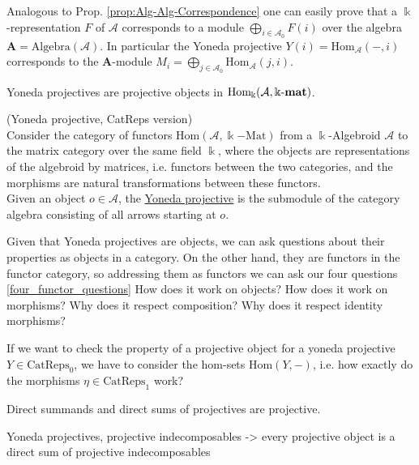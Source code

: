 Analogous to Prop. \ref{prop:Alg-Alg-Correspondence} one can easily prove that a $\Bbbk$-representation $F$ of $\mathcal{A}$ corresponds to a 
module $\bigoplus_{i \in \mathcal{A}_{0}} F(i)$ over the algebra $\mathbf{A} = \mathrm{Algebra}(\mathcal{A})$.
In particular the Yoneda projective $Y(i) = \mathrm{Hom}_{\mathcal{A}}(-,i)$ corresponds to the $\mathbf{A}$-module
$M_{i} = \bigoplus_{j \in \mathcal{A}_{0}} \mathrm{Hom}_{\mathcal{A}}(j,i)$.

\begin{lemma}
Yoneda projectives are projective objects in $\mathrm{Hom_{\Bbbk}}(\mathcal{A},\Bbbk\textnormal{-}\mathbf{mat})$.
\end{lemma}

\begin{definition}{(Yoneda projective, CatReps version)}\label{la:yoneda_projective}\\
Consider the category of functors $\mathrm{Hom}( \mathcal{A}, \Bbbk\mathrm{-Mat} )$ from a $\Bbbk$-Algebroid $\mathcal{A}$ to the matrix category
over the same field $\Bbbk$, where the objects are representations of the algebroid by matrices, i.e. functors between the two categories, and
the morphisms are natural transformations between these functors.\\
\noindent Given an object $o \in \mathcal{A}$, the \ul{Yoneda projective} is the submodule of the category algebra consisting of all arrows
starting at $o$.
\end{definition}

Given that Yoneda projectives are objects, we can ask questions about their properties as objects in a category. On the other hand, they are
functors in the functor category, so addressing them as functors we can ask our four questions \ref{four_functor_questions} 
How does it work on objects? How does it work on morphisms? Why does it respect composition? Why does it respect identity morphisms?

If we want to check the property of a projective object for a yoneda projective $Y \in \mathrm{CatReps}_{0}$, we have to consider the
hom-sets $\mathrm{Hom}(Y,-)$, i.e. how exactly do the morphisms $\eta \in \mathrm{CatReps}_{1}$ work?





Direct summands and direct sums of projectives are projective.

Yoneda projectives, projective indecomposables -> every projective object is a direct sum of projective indecomposables


